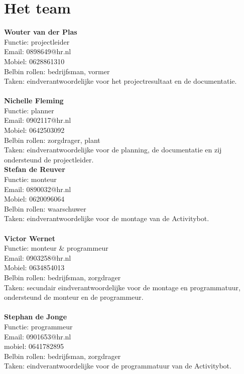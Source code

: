 \documentclass[oneside]{book}
\begin{document}
\section*{Het team}
\textbf{Wouter van der Plas}\\
Functie: projectleider\\
Email: 0898649@hr.nl\\
Mobiel: 0628861310\\
Belbin rollen: bedrijfsman, vormer\\
Taken: eindverantwoordelijke voor het  projectresultaat en de documentatie.\\
\\
\textbf{Nichelle Fleming}\\
Functie: planner\\
Email: 0902117@hr.nl\\
Mobiel: 0642503092\\
Belbin rollen: zorgdrager, plant\\
Taken: eindverantwoordelijke voor de planning, de documentatie en zij ondersteund de projectleider.\\
\clearpage
\textbf{Stefan de Reuver}\\
Functie: monteur\\
Email: 0890032@hr.nl\\
Mobiel: 0620096064\\
Belbin rollen: waarschuwer\\
Taken: eindverantwoordelijke voor de montage van de Activitybot.\\
\\
\textbf{Victor Wernet}\\
Functie: monteur \& programmeur\\
Email: 0903258@hr.nl\\
Mobiel: 0634854013\\
Belbin rollen: bedrijfsman, zorgdrager\\
Taken: secundair eindverantwoordelijke voor de montage en programmatuur, ondersteund de monteur en de programmeur.\\
\\
\textbf{Stephan de Jonge}\\
Functie: programmeur\\
Email: 0901653@hr.nl\\
mobiel: 0641782895\\
Belbin rollen: bedrijfsman, zorgdrager\\
Taken: eindverantwoordelijke voor de programmatuur van de Activitybot.
\end{document}
